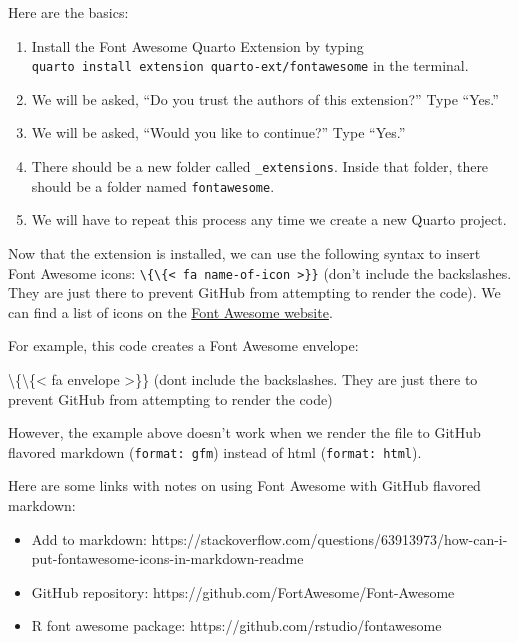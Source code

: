 \documentclass[
  letterpaper,
  DIV=11,
  numbers=noendperiod]{scrreprt}
\newenvironment{Shaded}{\begin{snugshade}}{\end{snugshade}}
\newcommand{\NormalTok}[1]{\textcolor[rgb]{0.00,0.23,0.31}{#1}}
\newcommand{\SpecialCharTok}[1]{\textcolor[rgb]{0.37,0.37,0.37}{#1}}
\providecommand{\tightlist}{%
  \setlength{\itemsep}{0pt}\setlength{\parskip}{0pt}}\usepackage{longtable,booktabs,array}
\begin{document}
Here are the basics:

\begin{enumerate}
\def\labelenumi{\arabic{enumi}.}
\tightlist
\item
  Install the Font Awesome Quarto Extension by typing
  \texttt{quarto\ install\ extension\ quarto-ext/fontawesome} in the
  terminal.
\item
  We will be asked, ``Do you trust the authors of this extension?'' Type
  ``Yes.''
\item
  We will be asked, ``Would you like to continue?'' Type ``Yes.''
\item
  There should be a new folder called \texttt{\_extensions}. Inside that
  folder, there should be a folder named \texttt{fontawesome}.
\item
  We will have to repeat this process any time we create a new Quarto
  project.
\end{enumerate}

Now that the extension is installed, we can use the following syntax to
insert Font Awesome icons:
\texttt{\textbackslash{}\{\textbackslash{}\{\textless{}\ fa\ name-of-icon\ \textgreater{}\}\}}
(don't include the backslashes. They are just there to prevent GitHub
from attempting to render the code). We can find a list of icons on the
\href{https://fontawesome.com/search}{Font Awesome website}.

For example, this code creates a Font Awesome envelope:

\begin{Shaded}
\begin{Highlighting}[]
\SpecialCharTok{\textbackslash{}\{\textbackslash{}\{}\NormalTok{\textless{} fa envelope \textgreater{}\}\} (don\textquotesingle{}t include the backslashes. They are just there to prevent GitHub from attempting to render the code)}
\end{Highlighting}
\end{Shaded}

However, the example above doesn't work when we render the file to
GitHub flavored markdown (\texttt{format:\ gfm}) instead of html
(\texttt{format:\ html}).

Here are some links with notes on using Font Awesome with GitHub
flavored markdown:

\begin{itemize}
\tightlist
\item
  Add to markdown:
  https://stackoverflow.com/questions/63913973/how-can-i-put-fontawesome-icons-in-markdown-readme
\item
  GitHub repository: https://github.com/FortAwesome/Font-Awesome
\item
  R font awesome package: https://github.com/rstudio/fontawesome
\end{itemize}
\end{document}
